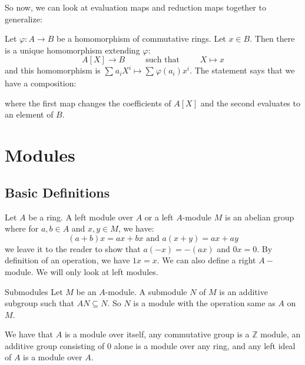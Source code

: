 \documentclass{report}
\begin{document}
So now, we can look at evaluation maps and reduction maps together to generalize:

Let $\varphi: A \rightarrow B$ be a homomorphism of commutative rings. Let $x \in B$. Then there is a unique homomorphism extending $\varphi$:
    \begin{equation*}
        A[X] \rightarrow B \hspace{30pt} \text{such that} \hspace{30pt} X \mapsto x
    \end{equation*}
and this homomorphism is $\sum_{}^{} a_{i}X^{i} \mapsto \sum_{}^{} \varphi(a_{i})x^{i}$. The statement says that we have a composition:
    \begin{center}
    \end{center}
where the first map changes the coefficients of $A[X]$ and the second evaluates to an element of $B$. 

\chapter{Modules}

\begin{topic}
    \section{Basic Definitions}
\end{topic}

Let $A$ be a ring. A left module over $A$ or a left $A$-module $M$ is an abelian group where for $a, b \in A$ and $x, y \in M$, we have:
    \begin{equation*}
        (a + b)x = ax + bx \text{ and } a(x + y) = ax + ay
    \end{equation*}
we leave it to the reader to show that $a(-x) = -(ax)$ and $0x = 0$. By definition of an operation, we have $1x = x$. We can also define a right $A-$ module. We will only look at left modules. 

\begin{definition}{Submodules}
    Let $M$ be an $A$-module. A submodule $N$ of $M$ is an additive subgroup such that $AN \subseteq N$. So $N$ is a module with the operation same as $A$ on $M$.
\end{definition}

\begin{examples}
    \begin{example}
        We have that $A$ is a module over itself, any commutative group is a $\mathbb{Z}$ module, an additive group consisting of $0$ alone is a module over any ring, and any left ideal of $A$ is a module over $A$.
    \end{example}
\end{examples}
\end{document}
